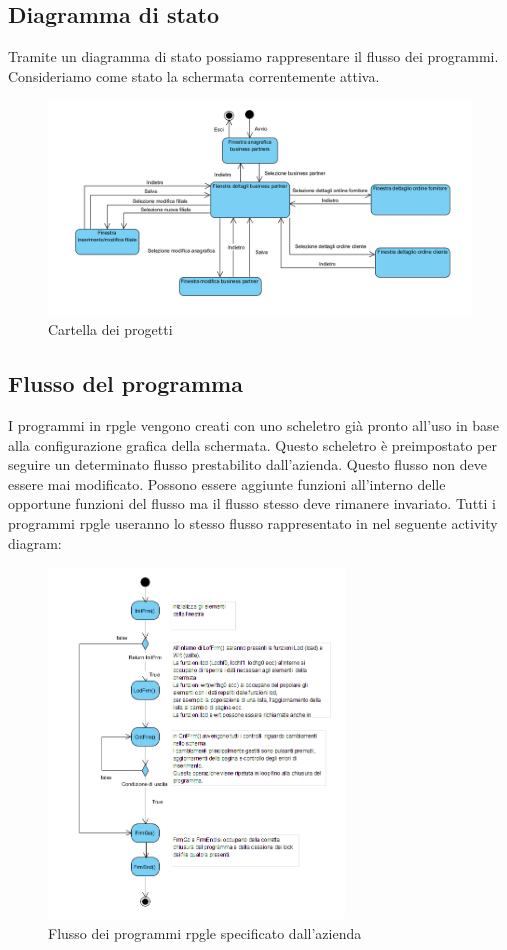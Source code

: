 \documentclass[target=bach,aauheader=,style=]{thud}
\begin{document}
\subsection{Diagramma di stato}
Tramite un diagramma di stato possiamo rappresentare il flusso dei programmi.
Consideriamo come stato la schermata correntemente attiva.

\begin{figure}[H]
    \centering
    \includegraphics[width=\textwidth]{diagrammi/state progetto 1.png}
    \caption{Cartella dei progetti}
\end{figure}

\subsection{Flusso del programma}
I programmi in rpgle vengono creati con uno scheletro già pronto all'uso in base alla configurazione grafica della schermata.
Questo scheletro è preimpostato per seguire un determinato flusso prestabilito dall'azienda.
Questo flusso non deve essere mai modificato. Possono essere aggiunte funzioni all'interno delle opportune funzioni del flusso ma il flusso stesso deve rimanere invariato.
Tutti i programmi rpgle useranno lo stesso flusso rappresentato in nel seguente activity diagram:

\begin{figure}[H]
    \centering
    \includegraphics[width=0.7\textwidth]{diagrammi/flusso.png}
    \caption{Flusso dei programmi rpgle specificato dall'azienda}
\end{figure}
\end{document}
